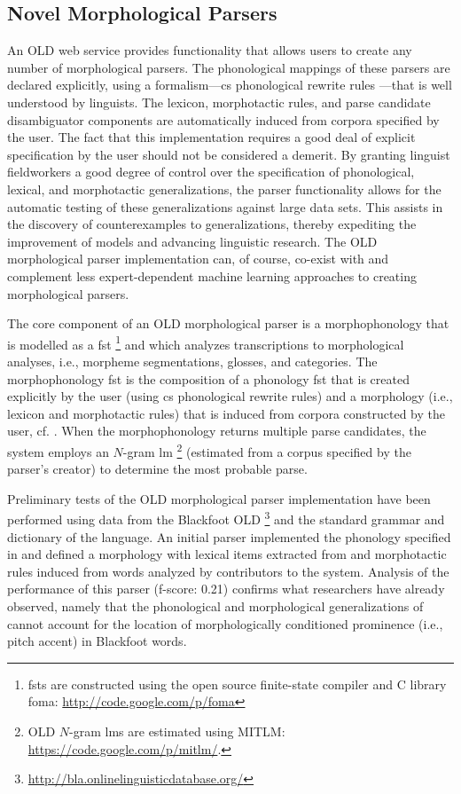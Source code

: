 \documentclass[11pt]{article}
\begin{document}
\subsection{Novel Morphological Parsers}
\label{sec:old-parsers}

An OLD web service provides functionality that allows users to create any
number of morphological parsers. The phonological mappings of these parsers
are declared explicitly, using a formalism---\gls{cs} phonological rewrite
rules \cite{chomsky68}---that is well understood by linguists. The lexicon,
morphotactic rules, and parse candidate disambiguator components are
automatically induced from corpora specified by the user. The fact that this
implementation requires a good deal of explicit specification by the user
should not be considered a demerit. By granting linguist fieldworkers a good
degree of control over the specification of phonological, lexical, and
morphotactic generalizations, the parser functionality allows for the automatic
testing of these generalizations against large data sets. This assists
in the discovery of counterexamples to generalizations, thereby expediting
the improvement of models and advancing linguistic research. The OLD
morphological parser implementation can, of course, co-exist with and
complement less expert-dependent machine learning approaches to creating
morphological parsers.

The core component of an OLD morphological parser is a morphophonology that is
modelled as a \gls{fst}%
\footnote{\glspl{fst} are constructed using the open source finite-state
compiler and C library foma: \url{http://code.google.com/p/foma}} %
and which analyzes transcriptions to morphological analyses, i.e., morpheme
segmentations, glosses, and categories. The morphophonology \gls{fst} is the
composition of a phonology \gls{fst} that is created explicitly by the user
(using \gls{cs} phonological rewrite rules) and a morphology (i.e., lexicon and
morphotactic rules) that is induced from corpora constructed by the user, cf. 
\cite{beesley2003finite,hulden2012}. When the morphophonology returns multiple
parse candidates, the system employs an $N$-gram \gls{lm}%
\footnote{OLD $N$-gram \glspl{lm} are estimated using MITLM:
\url{https://code.google.com/p/mitlm/}.} %
(estimated from a corpus specified by the parser's creator) to determine the
most probable parse.

Preliminary tests of the OLD morphological parser implementation have been
performed using data from the Blackfoot OLD%
\footnote{\url{http://bla.onlinelinguisticdatabase.org/}} %
and the standard grammar \cite{frantz91} and dictionary \cite{frantz95} of the
language. An initial parser implemented the phonology specified in
\cite{frantz91} and defined a morphology with lexical items extracted from
\cite{frantz95} and morphotactic rules induced from words analyzed by
contributors to the system. Analysis of the performance of this parser
(f-score: 0.21) confirms what researchers \cite{weber2013} have already
observed, namely that the phonological and morphological generalizations of
\cite{frantz91} cannot account for the location of morphologically conditioned
prominence (i.e., pitch accent) in Blackfoot words.
\end{document}
